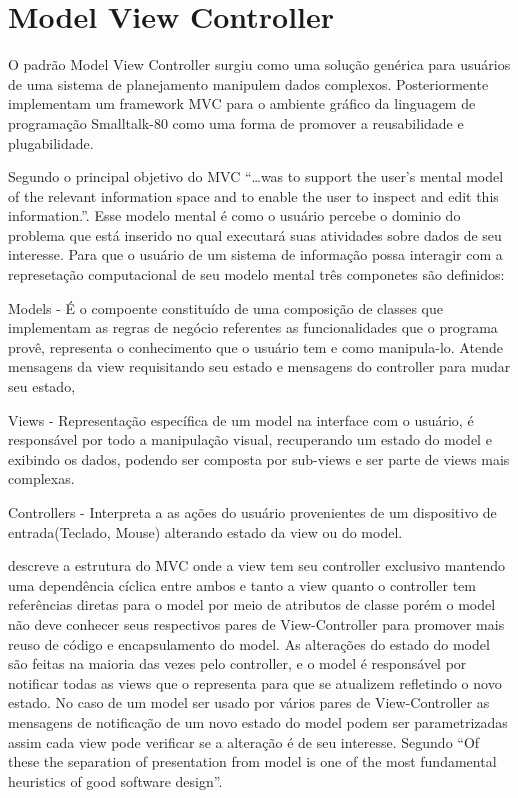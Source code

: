  


\section{Model View Controller}

O padrão Model View Controller surgiu como uma solução genérica para usuários
de uma sistema de planejamento manipulem dados complexos.
Posteriormente  implementam um framework MVC para o
ambiente gráfico da linguagem de programação Smalltalk-80 como uma forma de
promover a reusabilidade e plugabilidade.

Segundo  o principal objetivo do MVC ``\ldots was to
support the user's mental model of the relevant information space and to enable
the user to inspect and edit this information.''. Esse modelo mental é como o
usuário percebe o dominio do problema que está inserido no qual executará suas
atividades sobre dados de seu interesse. Para que o usuário de um sistema de
informação possa interagir com a represetação computacional  de seu modelo
mental três componetes são definidos:

Models - É o compoente constituído de uma composição de classes que implementam
as regras de negócio referentes as funcionalidades que o programa provê,
representa o  conhecimento que o usuário tem e como manipula-lo. Atende
mensagens da view requisitando seu estado e mensagens do controller para mudar
seu estado,

Views - Representação específica de um model na interface com o usuário, é 
responsável por todo a manipulação visual, recuperando um estado do model e
exibindo os dados, podendo ser composta por sub-views e ser parte de views mais
complexas.

Controllers - Interpreta a as ações do usuário provenientes de um dispositivo de
entrada(Teclado, Mouse) alterando estado da view ou do model.




 descreve a estrutura do MVC onde a view tem seu
controller exclusivo mantendo uma dependência cíclica entre ambos e tanto a view
quanto o controller tem referências diretas para o model por meio de atributos
de classe porém o model não deve conhecer seus respectivos pares de
View-Controller para promover mais reuso de código e encapsulamento do model. As
alterações do estado do model são feitas na maioria das vezes pelo controller, e
o model é responsável por notificar todas as views que o representa para que
se atualizem refletindo o novo estado. No caso de um model ser usado por vários
pares de View-Controller as mensagens de notificação de um novo estado do model
podem ser parametrizadas assim cada view pode verificar se a alteração é de seu
interesse. Segundo  ``Of these the separation of presentation
from model is one of the most fundamental heuristics of good software design''.

